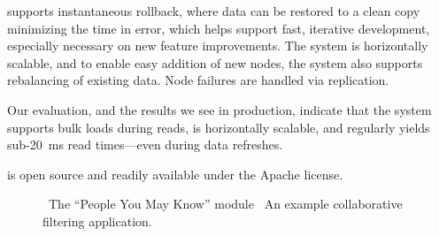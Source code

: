 \projectname{} supports instantaneous rollback, where data can be
restored to a clean copy minimizing the time in error, which helps
support fast, iterative development, especially necessary on new
feature improvements. The system is horizontally scalable, and to
enable easy addition of new nodes, the system also supports
rebalancing of existing data. Node failures are handled via
replication.

Our evaluation, and the results we see in production, indicate that
the system supports bulk loads during reads, is horizontally scalable,
and regularly yields sub-20~ms read times---even during data
refreshes.

\projectname{} is open source and readily available under the Apache
license. 

\begin{figure}
\centering
{}


\caption{~The ``People You May Know'' module
~An example collaborative filtering
application.}
\end{figure}

